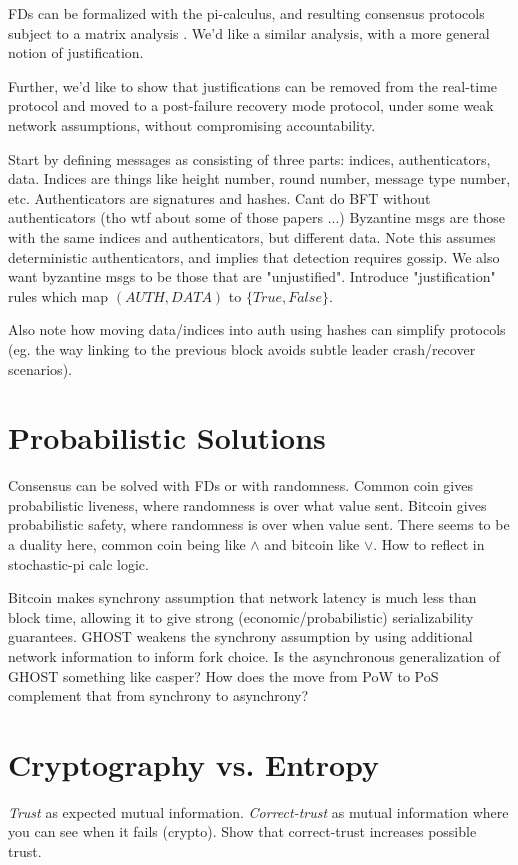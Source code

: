 FDs can be formalized with the pi-calculus, 
and resulting consensus protocols subject to a matrix analysis \cite{nestmann2003modeling}.
We'd like a similar analysis, with a more general notion of justification.

Further, we'd like to show that justifications can be removed from the real-time
protocol and moved to a post-failure recovery mode protocol, under some weak network assumptions,
without compromising accountability.

Start by defining messages as consisting of three parts: indices, authenticators, data.
Indices are things like height number, round number, message type number, etc.
Authenticators are signatures and hashes.
Cant do BFT without authenticators (tho wtf about some of those papers ...)
Byzantine msgs are those with the same indices and authenticators, but different data.
Note this assumes deterministic authenticators, and implies that detection requires gossip.
We also want byzantine msgs to be those that are "unjustified".
Introduce "justification" rules which map $(AUTH, DATA)$ to $\{True, False\}$.

Also note how moving data/indices into auth using hashes can simplify protocols
(eg. the way linking to the previous block avoids subtle leader crash/recover scenarios).

\section{Probabilistic Solutions}
Consensus can be solved with FDs or with randomness.
Common coin gives probabilistic liveness, where randomness is over what value sent.
Bitcoin gives probabilistic safety, where randomness is over when value sent.
There seems to be a duality here, common coin being like $\wedge$ and bitcoin like $\vee$.
How to reflect in stochastic-pi calc logic.

Bitcoin makes synchrony assumption that network latency is much less than block time,
allowing it to give strong (economic/probabilistic) serializability guarantees.
GHOST weakens the synchrony assumption by using additional network information to inform fork choice.
Is the asynchronous generalization of GHOST something like casper?
How does the move from PoW to PoS complement that from synchrony to asynchrony?

\section{Cryptography vs. Entropy}
\emph{Trust} as expected mutual information.
\emph{Correct-trust} as mutual information where you can see when it fails (crypto).
Show that correct-trust increases possible trust.

